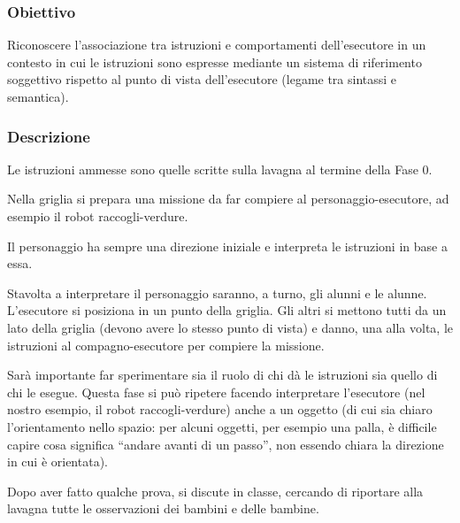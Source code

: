 \ruoliattivita{\ruoloProgrammatore\quad\ruoloEsecutore}

\subsubsection{Obiettivo}\label{obiettivo-2}

Riconoscere l'associazione tra istruzioni e comportamenti dell'esecutore in un contesto in cui le istruzioni sono espresse mediante un sistema di riferimento soggettivo rispetto al punto di vista dell'esecutore (legame tra sintassi e semantica).

\subsubsection{Descrizione}\label{descrizione-1}

Le istruzioni ammesse sono quelle scritte sulla lavagna al termine della Fase 0.

Nella griglia si prepara una missione da far compiere al personaggio-esecutore, ad esempio il robot raccogli-verdure.

Il personaggio ha sempre una direzione iniziale e interpreta le istruzioni in base a essa.

Stavolta a interpretare il personaggio saranno, a turno, gli alunni e le alunne. L'esecutore si posiziona in un punto della griglia. Gli altri si mettono tutti da un lato della griglia (devono avere lo stesso punto di vista) e danno, una alla volta, le istruzioni al compagno-esecutore per compiere la missione.

Sarà importante far sperimentare sia il ruolo di chi dà le istruzioni sia quello di chi le esegue. Questa fase si può ripetere facendo interpretare l'esecutore (nel nostro esempio, il robot raccogli-verdure) anche a un oggetto (di cui sia chiaro l'orientamento nello spazio: per alcuni oggetti, per esempio una palla, è difficile capire cosa significa ``andare avanti di un passo'', non essendo chiara la direzione in cui è orientata).

Dopo aver fatto qualche prova, si discute in classe, cercando di riportare alla lavagna tutte le osservazioni dei bambini e delle bambine.

